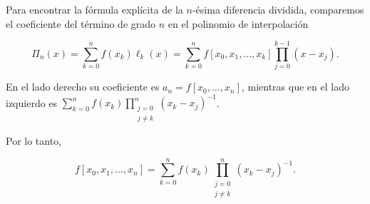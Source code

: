 \begin{frame}
	\begin{solution}
		Para encontrar la fórmula explícita de la
		\alert{$n$-ésima diferencia dividida}, comparemos el coeficiente
		del término de grado $n$ en el polinomio de interpolación

		\begin{equation*}
			\Pi_{n}\left(x\right)=
			\sum\limits_{k=0}^{n}
			f\left(x_{k}\right)
			\ell_{k}\left(x\right)=
			\sum\limits_{k=0}^{n}
			f\left[x_{0},x_{1},\ldots,x_{k}\right]
			\prod\limits_{j=0}^{k-1}
			\left(x-x_{j}\right).
		\end{equation*}

		En el lado derecho su coeficiente es
		$a_{n}=f\left[x_{0},\ldots,x_{n}\right]$, mientras que en el lado
		izquierdo es
		\begin{math}
			\sum\limits_{k=0}^{n}
			f\left(x_{k}\right)
			\prod\limits_{\substack{j=0\\j\neq k}}^{n}
			{\left(x_{k}-x_{j}\right)}^{-1}
		\end{math}.

		Por lo tanto,

		\begin{equation*}
			f\left[x_{0},x_{1},\ldots,x_{n}\right]=
			\sum\limits_{k=0}^{n}
			f\left(x_{k}\right)
			\prod\limits_{\substack{j=0\\j\neq k}}^{n}
			{\left(x_{k}-x_{j}\right)}^{-1}.
		\end{equation*}



	\end{solution}
\end{frame}

